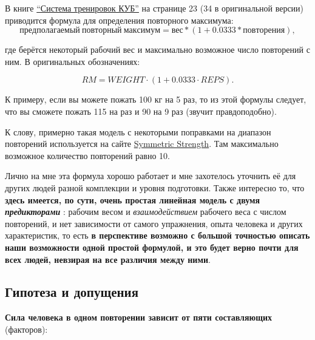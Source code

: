 \documentclass[
]{article}
\begin{document}
В книге
\href{https://forum.steelfactor.ru/index.php?showtopic=44596}{``Система
тренировок КУБ''} на странице 23 (34 в оригинальной версии) приводится
формула для определения повторного максимума:
\[предполагаемый\ повторный\ максимум = вес * (1 + 0.0333 * повторения),\]

где берётся некоторый рабочий вес и максимально возможное число
повторений с ним. В оригинальных обозначениях:

\[RM=WEIGHT \cdot (1+0.0333\cdot REPS).\]

К примеру, если вы можете пожать 100 кг на 5 раз, то из этой формулы
следует, что вы сможете пожать 115 на раз и 90 на 9 раз (звучит
правдоподобно).

К слову, примерно такая модель с некоторыми поправками на диапазон
повторений используется на сайте
\href{https://symmetricstrength.com}{Symmetric Strength}. Там
максимально возможное количество повторений равно 10.

Лично на мне эта формула хорошо работает и мне захотелось уточнить её
для других людей разной комплекции и уровня подготовки. Также интересно
то, что \textbf{здесь имеется, по сути, очень простая линейная модель с
двумя \emph{предикторами} }: рабочим весом и \emph{взаимодействием}
рабочего веса с числом повторений, и нет зависимости от самого
упражнения, опыта человека и других характеристик, то есть \textbf{в
перспективе возможно с большой точностью описать наши возможности одной
простой формулой, и это будет верно почти для всех людей, невзирая на
все различия между ними}.

\hypertarget{ux433ux438ux43fux43eux442ux435ux437ux430-ux438-ux434ux43eux43fux443ux449ux435ux43dux438ux44f}{%
\subsection{Гипотеза и
допущения}\label{ux433ux438ux43fux43eux442ux435ux437ux430-ux438-ux434ux43eux43fux443ux449ux435ux43dux438ux44f}}

\textbf{Сила человека в одном повторении зависит от пяти составляющих}
(факторов):
\end{document}
